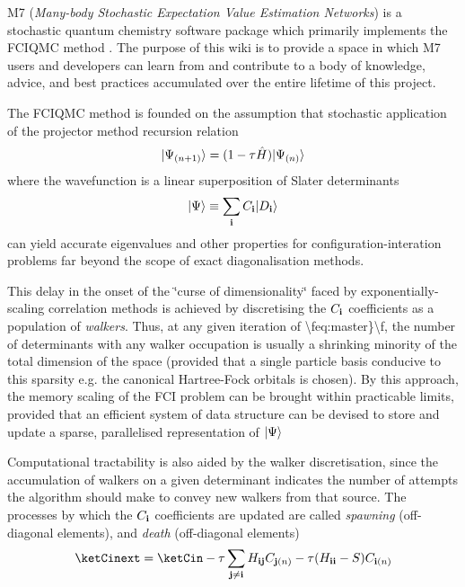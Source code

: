 M7 ({\itshape Many-\/body Stochastic Expectation Value Estimation Networks}) is a stochastic quantum chemistry software package which primarily implements the F\+C\+I\+Q\+MC method \cite{doi:10.1063/1.3193710}. The purpose of this wiki is to provide a space in which M7 users and developers can learn from and contribute to a body of knowledge, advice, and best practices accumulated over the entire lifetime of this project.

The F\+C\+I\+Q\+MC method is founded on the assumption that stochastic application of the projector method recursion relation \[ \label{eq:master} |\Psi_{(n+1)}\rangle = (1-\tau\hat{H})|\Psi_{(n)}\rangle \] where the wavefunction is a linear superposition of Slater determinants \[ \label{eq:psidef} |\Psi\rangle \equiv \sum_{\mathbf{i}} C_{\mathbf{i}} |D_{\mathbf{i}}\rangle \] can yield accurate eigenvalues and other properties for configuration-\/interation problems far beyond the scope of exact diagonalisation methods.

This delay in the onset of the \char`\"{}curse of dimensionality\char`\"{} faced by exponentially-\/scaling correlation methods is achieved by discretising the $C_{\mathbf{i}}$ coefficients as a population of {\itshape walkers}. Thus, at any given iteration of \textbackslash{}feq\+:master\}\textbackslash{}f, the number of determinants with any walker occupation is usually a shrinking minority of the total dimension of the space (provided that a single particle basis conducive to this sparsity e.\+g. the canonical Hartree-\/\+Fock orbitals is chosen). By this approach, the memory scaling of the F\+CI problem can be brought within practicable limits, provided that an efficient system of data structure can be devised to store and update a sparse, parallelised representation of $|\Psi\rangle$

Computational tractability is also aided by the walker discretisation, since the accumulation of walkers on a given determinant indicates the number of attempts the algorithm should make to convey new walkers from that source. The processes by which the $C_{\mathbf{i}}$ coefficients are updated are called {\itshape spawning} (off-\/diagonal elements), and {\itshape death} (off-\/diagonal elements) \[ \ketCinext = \ketCin - \tau \sum_{\bfj\neq\bfi} \Hij \Cjn - \tau(\Hii - S) \Cin \] 